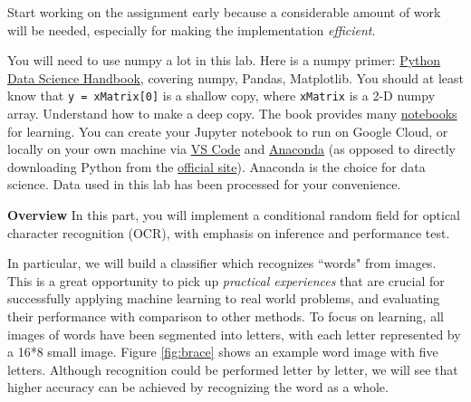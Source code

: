 \documentclass[11pt]{report}
\begin{document}
	
	Start working on the assignment early
	because a considerable amount of work will be needed,
	especially for making the implementation \emph{efficient}.
	
	You will need to use numpy a lot in this lab.
	Here is a numpy primer: \href{https://jakevdp.github.io/PythonDataScienceHandbook/}{Python Data Science Handbook}, covering numpy, Pandas, Matplotlib.
	You should at least know that \texttt{y = xMatrix[0]} is a shallow copy,
	where \texttt{xMatrix} is a 2-D numpy array. 
	Understand how to make a deep copy.
	The book provides many \href{https://github.com/jakevdp/PythonDataScienceHandbook}{notebooks} for learning. 
	You can create your Jupyter notebook to run on Google Cloud,
	or locally on your own machine via \href{https://code.visualstudio.com/docs/python/python-tutorial}{VS Code} and \href{https://www.anaconda.com/products/individual}{Anaconda} (as opposed to directly downloading Python from the \href{https://www.python.org/downloads/}{official site}).
	Anaconda is the choice for data science.
	Data used in this lab has been processed for your convenience.
	
	
	\newpage
	
	
	
	{\bf \large Overview}	
	In this part, you will implement a conditional random field for optical character recognition (OCR),
	with emphasis on inference and performance test.
	
	
	
	
	
	
	In particular, we will build a classifier which recognizes ``words" from images.
	This is a great opportunity to pick up \emph{practical experiences} that are crucial for successfully applying machine learning to real world problems,
	and evaluating their performance with comparison to other methods.
	To focus on learning, all images of words have been segmented into letters,
	with each letter represented by a 16*8 small image.
	Figure \ref{fig:brace} shows an example word image with five letters.
	Although recognition could be performed letter by letter,
	we will see that higher accuracy can be achieved by recognizing the word as a whole.
	
\end{document}
